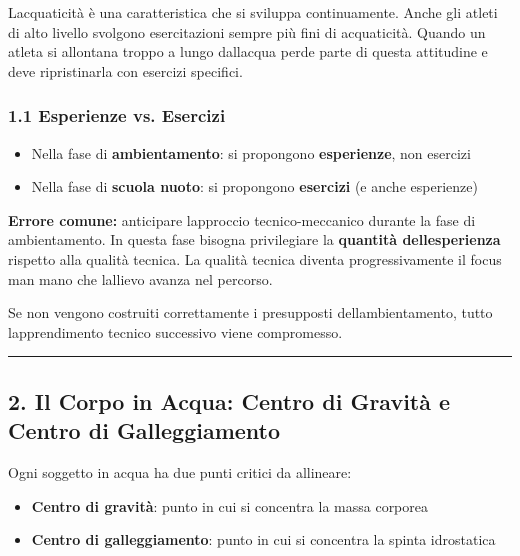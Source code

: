 \documentclass[a4paper,11pt]{article}
\providecommand{\tightlist}{%
  \setlength{\itemsep}{0pt}\setlength{\parskip}{0pt}}
\begin{document}
L\textquotesingle acquaticità è una caratteristica che si sviluppa
continuamente. Anche gli atleti di alto livello svolgono esercitazioni
sempre più fini di acquaticità. Quando un atleta si allontana troppo a
lungo dall\textquotesingle acqua perde parte di questa attitudine e deve
ripristinarla con esercizi specifici.

\subsubsection{1.1 Esperienze vs.
      Esercizi}\label{esperienze-vs.-esercizi}

\begin{itemize}
      \tightlist
      \item
            Nella fase di \textbf{ambientamento}: si propongono
            \textbf{esperienze}, non esercizi
      \item
            Nella fase di \textbf{scuola nuoto}: si propongono \textbf{esercizi}
            (e anche esperienze)
\end{itemize}

\textbf{Errore comune:} anticipare l\textquotesingle approccio
tecnico-meccanico durante la fase di ambientamento. In questa fase
bisogna privilegiare la \textbf{quantità
      dell\textquotesingle esperienza} rispetto alla qualità tecnica. La
qualità tecnica diventa progressivamente il focus man mano che
l\textquotesingle allievo avanza nel percorso.

Se non vengono costruiti correttamente i presupposti
dell\textquotesingle ambientamento, tutto
l\textquotesingle apprendimento tecnico successivo viene compromesso.

\begin{center}\rule{0.5\linewidth}{0.5pt}\end{center}

\subsection{2. Il Corpo in Acqua: Centro di Gravità e Centro di
      Galleggiamento}\label{il-corpo-in-acqua-centro-di-gravituxe0-e-centro-di-galleggiamento}

Ogni soggetto in acqua ha due punti critici da allineare:

\begin{itemize}
      \tightlist
      \item
            \textbf{Centro di gravità}: punto in cui si concentra la massa
            corporea
      \item
            \textbf{Centro di galleggiamento}: punto in cui si concentra la spinta
            idrostatica
\end{itemize}
\end{document}
